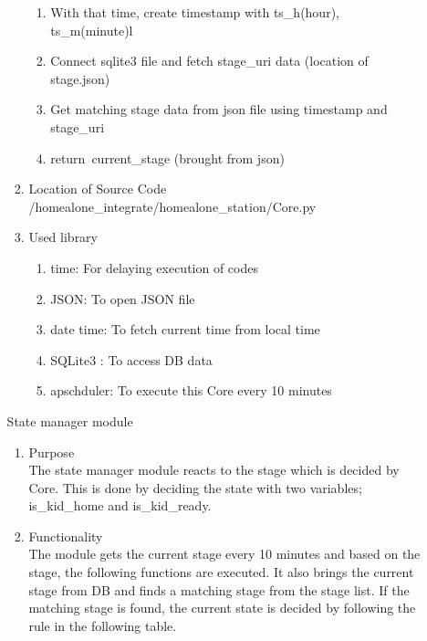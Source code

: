 \documentclass[conference]{IEEEtran}
\begin{document}
\begin{enumerate}[label=\arabic*.]
\begin{enumerate}[label=\arabic*.]
\begin{enumerate}[label=\alph*.]
\begin{enumerate}[label=\roman*.]
            \item {\large{With that time, create timestamp with ts\_h(hour), ts\_m(minute)l}}
            \item {\large{Connect sqlite3 file and fetch stage\_uri data (location of stage.json)}}
            \item {\large{Get matching stage data from json file using timestamp and stage\_uri}}
            \item {\large{return\ current\_stage (brought from json)}}\\
        \end{enumerate}
        \item{\large{Location of Source Code}}\\
        \large{/homealone\_integrate/homealone\_station/Core.py}\\   
        \item {\large{Used library}}
        \begin{enumerate}[label=\roman*.]
            \item {\large{time: For delaying execution of codes}}
            \item {\large{JSON: To open JSON file}}
            \item {\large{date time: To fetch current time from local time}}
            \item {\large{SQLite3 : To access DB data}}
            \item {\large{apschduler: To execute this Core every 10 minutes}}
        \end{enumerate}
    \end{enumerate}
    \begin{center}\large{State manager module}\end{center} 
    \begin{enumerate}[label=\alph*.]
        \item {\large{Purpose}}\\
        The state manager module reacts to the stage which is decided by Core. This is done by deciding the state with two variables; is\_kid\_home and  is\_kid\_ready.\\
        \item {\large{Functionality}}\\
        The module gets the current stage every 10 minutes and based on the stage, the following functions are executed. It also brings the current stage from DB and finds a matching stage from the stage list. If the matching stage is found, the current state is decided by following the rule in the following table.\\

\end{enumerate}
\end{enumerate}
\end{enumerate}
\end{document}
